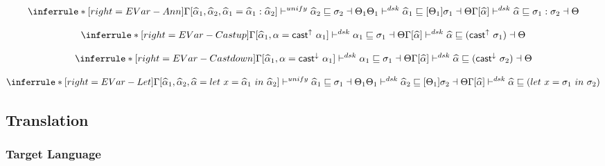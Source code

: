 \[
\inferrule*[right=EVar-Ann]
{
\Gamma[\widehat \alpha_1, \widehat \alpha_2, \widehat \alpha_1 = \widehat \alpha_1:\widehat \alpha_2]
\unify \widehat \alpha_2 \sqsubseteq \sigma_2 \dashv \Theta_1 \\
\Theta_1 \polymorphic \widehat \alpha_1 \sqsubseteq [\Theta_1]\sigma_1 \dashv \Theta }
{\Gamma[\widehat \alpha] \polymorphicstar \widehat \alpha \sqsubseteq \sigma_1:\sigma_2 \dashv \Theta}
\]

\[
\inferrule*[right=EVar-Castup]
{
\Gamma[\widehat \alpha_1, \alpha = \castupe \alpha_1] \polymorphic  \alpha_1 \sqsubseteq \sigma_1 \dashv \Theta}
{\Gamma[\widehat \alpha] \polymorphicstar  \widehat \alpha \sqsubseteq  (\castupe \sigma_1) \dashv \Theta}
\]

\[
\inferrule*[right=EVar-Castdown]
{
\Gamma[\widehat \alpha_1, \alpha = \castdowne \alpha_1] \polymorphic  \alpha_1 \sqsubseteq \sigma_1 \dashv \Theta}
{\Gamma[\widehat \alpha] \polymorphicstar  \widehat \alpha \sqsubseteq  (\castdowne \sigma_2) \dashv \Theta}
\]

\[
\inferrule*[right=EVar-Let]
{
\Gamma[\widehat \alpha_1, \widehat \alpha_2, \widehat \alpha = let~x=\widehat \alpha_1~in~\widehat \alpha_2]
\unify \widehat \alpha_1 \sqsubseteq \sigma_1 \dashv \Theta_1 \\
\Theta_1 \polymorphic \widehat \alpha_2 \sqsubseteq [\Theta_1]\sigma_2 \dashv \Theta }
{\Gamma[\widehat \alpha] \polymorphicstar \widehat \alpha  \sqsubseteq  (let\ x = \sigma_1\ in\ \sigma_2) }
\]

\iffalse

\framebox{$\Gamma[\alpha] \dskunify \rho \sqsubseteq \widehat \alpha$}

\[
\inferrule*[right=Uni-Tau-EVar]
{ \widehat \alpha \notin ftv(\tau)} %
{\Gamma[\widehat \alpha ] \unify \tau \sqsubseteq \widehat \alpha \dashv \Gamma[\widehat \alpha=\tau] }

\]

\fi

\clearpage


\subsection{Translation}

\newcommand{\transto}[1]{\leadsto#1}
\newcommand{\translated}[1]{|#1|}
\newcommand{\cyancolorbox}[1]{\colorbox{cyan!30}{$#1$}}
\newcommand{\invariant}[2]{}

\subsubsection{Target Language}

